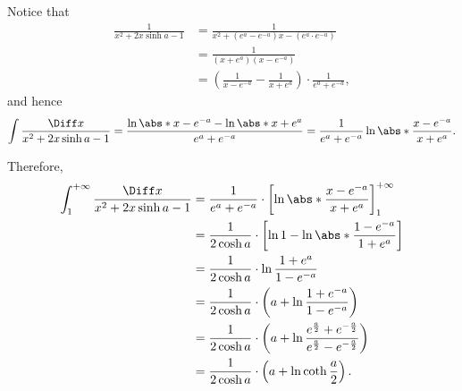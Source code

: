 \begin{enumerate}
          Notice that
          \begin{align*}
              \frac{1}{x^2 + 2x \sinh a - 1} & = \frac{1}{x^2 + (e^a - e^{-a})x - (e^a \cdot e^{-a})}                                \\
                                             & = \frac{1}{(x + e^a) (x - e^{-a})}                                                    \\
                                             & = \left(\frac{1}{x - e^{-a}} - \frac{1}{x + e^a}\right) \cdot \frac{1}{e^a + e^{-a}},
          \end{align*}
          and hence
          \[
              \int \frac{\Diff x}{x^2 + 2x \sinh a - 1} = \frac{\ln \abs*{x - e^{-a}} - \ln \abs*{x + e^a}}{e^a + e^{-a}} = \frac{1}{e^a + e^{-a}} \ln \abs*{\frac{x - e^{-a}}{x + e^a}}.
          \]

          Therefore,
          \begin{align*}
              \int_{1}^{+\infty} \frac{\Diff x}{x^2 + 2x \sinh a - 1} & = \frac{1}{e^a + e^{-a}} \cdot \left[\ln \abs*{\frac{x - e^{-a}}{x + e^a}}\right]_{1}^{+\infty}                                \\
                                                                      & = \frac{1}{2 \cosh a} \cdot \left[\ln 1 - \ln \abs*{\frac{1 - e^{-a}}{1 + e^a}}\right]                                         \\
                                                                      & = \frac{1}{2 \cosh a} \cdot \ln \frac{1 + e^a}{1 - e^{-a}}                                                                     \\
                                                                      & = \frac{1}{2 \cosh a} \cdot \left(a + \ln \frac{1 + e^{-a}}{1 - e^{-a}}\right)                                                 \\
                                                                      & = \frac{1}{2 \cosh a} \cdot \left(a + \ln \frac{e^{\frac{a}{2}} + e^{-\frac{a}{2}}}{e^{\frac{a}{2}} - e^{-\frac{a}{2}}}\right) \\
                                                                      & = \frac{1}{2 \cosh a} \cdot \left(a + \ln \coth \frac{a}{2}\right).
          \end{align*}


\end{enumerate}
